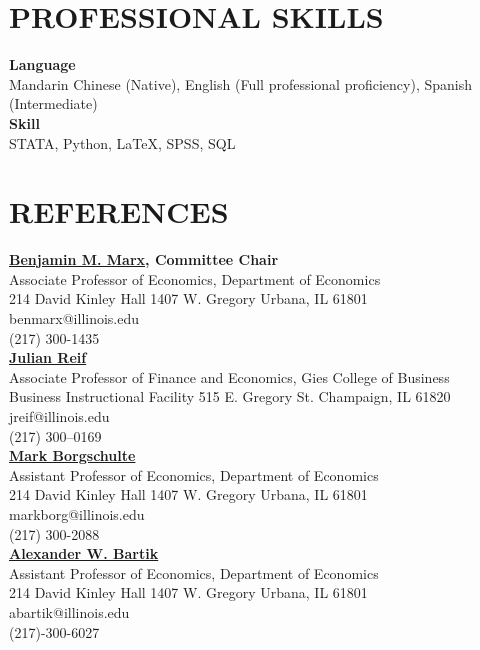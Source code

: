 \documentclass[a4paper,9pt]{extarticle}
\begin{document}
\section*{PROFESSIONAL SKILLS}

\noindent
\newline
\textbf{Language} \\
Mandarin Chinese (Native), English (Full professional proficiency), Spanish (Intermediate)
 \\

\noindent
\textbf{Skill} \\
STATA, Python, \LaTeX, SPSS, SQL  \\


\section*{REFERENCES}

\noindent
\newline
\textbf{\href{https://sites.google.com/site/benjaminmmarx/}{Benjamin M. Marx}, Committee Chair} \\
Associate Professor of Economics, Department of Economics \\
214 David Kinley Hall
1407 W. Gregory
Urbana, IL  61801\\
benmarx@illinois.edu \\
(217) 300-1435 \\

\noindent
\textbf{\href{https://julianreif.com}{Julian Reif}} \\
Associate Professor of Finance and Economics, Gies College of Business \\
Business Instructional Facility 515 E. Gregory St.
Champaign, IL 61820\\
jreif@illinois.edu \\
(217) 300–0169 \\

\noindent
\textbf{\href{https://sites.google.com/site/markborgschulte/home}{Mark Borgschulte}} \\
Assistant Professor of Economics, Department of Economics \\
214 David Kinley Hall
1407 W. Gregory
Urbana, IL  61801\\
markborg@illinois.edu \\
(217) 300-2088 \\
 
\noindent
\textbf{\href{https://www.alexbartik.com}{Alexander W. Bartik}} \\
Assistant Professor of Economics, Department of Economics \\
214 David Kinley Hall
1407 W. Gregory
Urbana, IL  61801\\
abartik@illinois.edu \\
(217)-300-6027 \\
\end{document}
